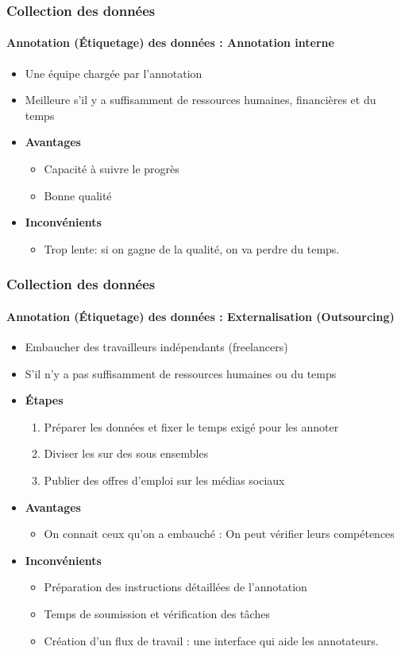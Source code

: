 \documentclass[xcolor=table]{beamer}
\begin{document}
\begin{frame}
\frametitle{Collection des données}
\framesubtitle{Annotation (Étiquetage) des données : Annotation interne}

\begin{itemize}
	\item Une équipe chargée par l'annotation
	\item Meilleure s'il y a suffisamment de ressources humaines, financières et du temps
	\item \textbf{Avantages} 
	\begin{itemize}
		\item Capacité à suivre le progrès
		\item Bonne qualité
	\end{itemize}
	\item \textbf{Inconvénients}
	\begin{itemize}
		\item Trop lente: si on gagne de la qualité, on va perdre du temps.
	\end{itemize}
\end{itemize}

\end{frame}

\begin{frame}
\frametitle{Collection des données}
\framesubtitle{Annotation (Étiquetage) des données : Externalisation (Outsourcing)}

\begin{itemize}
	\item Embaucher des travailleurs indépendants (freelancers)
	\item S'il n'y a pas suffisamment de ressources humaines ou du temps
	\item \textbf{Étapes}
	\begin{enumerate}
		\item Préparer les données et fixer le temps exigé pour les annoter
		\item Diviser les sur des sous ensembles
		\item Publier des offres d'emploi sur les médias sociaux
	\end{enumerate}
	\item \textbf{Avantages} 
	\begin{itemize}
		\item On connait ceux qu'on a embauché : On peut vérifier leurs compétences
	\end{itemize}
	\item \textbf{Inconvénients}
	\begin{itemize}
		\item Préparation des instructions détaillées de l'annotation
		\item Temps de soumission et vérification des tâches
		\item Création d'un flux de travail : une interface qui aide les annotateurs.
	\end{itemize}
\end{itemize}

\end{frame}
\end{document}
